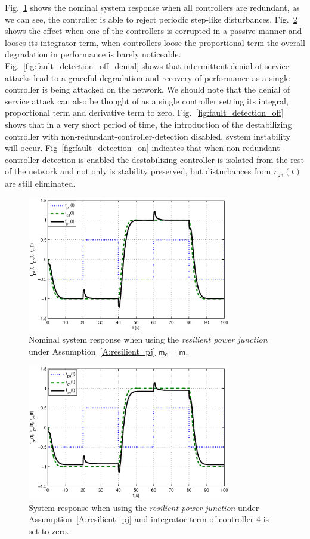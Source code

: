 Fig.~\ref{fig:fault_detection_off_nominal} shows the nominal system
response when all controllers are redundant, as we can see, the
controller is able to reject periodic step-like disturbances.
Fig.~\ref{fig:fault_detection_off_degrade} shows the effect when one
of the controllers is corrupted in a passive manner and looses its
integrator-term, when controllers loose the proportional-term the
overall degradation in performance is barely noticeable.
Fig.~\ref{fig:fault_detection_off_denial} shows that intermittent 
denial-of-service attacks lead to a graceful degradation and recovery
of performance as a single controller is being attacked on the
network.  We should note that the denial of service attack can also
be thought of as a single controller setting its integral,
proportional term and derivative term to zero.
Fig.~\ref{fig:fault_detection_off} shows that in a very short
period of time, the introduction of the destabilizing controller with
non-redundant-controller-detection disabled, system instability will
occur.  Fig~\ref{fig:fault_detection_on} indicates 
that when non-redundant-controller-detection is enabled the
destabilizing-controller is isolated from the rest of the network and
not only is stability preserved, but disturbances from
$r_{\mathsf{pn}}(t)$ are still eliminated.
\begin{figure}
  \centering
  \includegraphics[width=3.5in]{figures/fault_detection_off_nominal}
  \caption{Nominal system response when using the {\em resilient power
    junction} under Assumption~\ref{A:resilient_pj} $\mathsf{m_c}=\mathsf{m}$.}
  \label{fig:fault_detection_off_nominal}
\end{figure}
\begin{figure}
  \centering
  \includegraphics[width=3.5in]{figures/fault_detection_off_degrade}
  \caption{System response when using the {\em resilient power
    junction} under Assumption~\ref{A:resilient_pj} and integrator
  term of controller 4 is set to zero.}
  \label{fig:fault_detection_off_degrade}
\end{figure}
